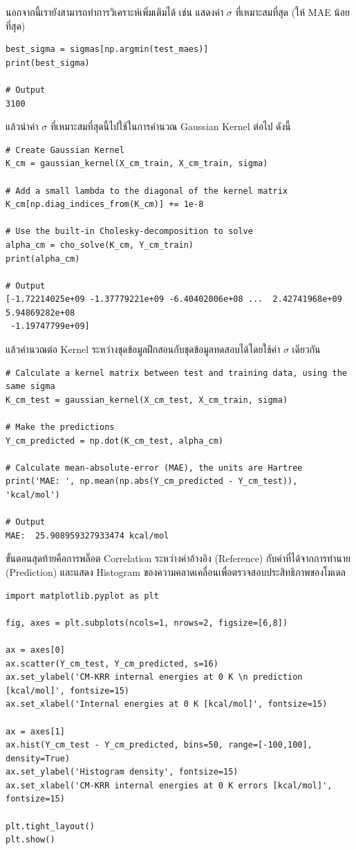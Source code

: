 นอกจากนี้เรายังสามารถทำการวิเคราะห์เพิ่มเติมได้ เช่น แสดงค่า $\sigma$ ที่เหมาะสมที่สุด (ให้ MAE น้อยที่สุด)

\begin{lstlisting}[style=MyPython]
best_sigma = sigmas[np.argmin(test_maes)]
print(best_sigma)

# Output
3100
\end{lstlisting}

\noindent แล้วนำค่า $\sigma$ ที่เหมาะสมที่สุดนี้ไปใช้ในการคำนวณ Gaussian Kernel ต่อไป ดังนี้

\begin{lstlisting}[style=MyPython]
# Create Gaussian Kernel
K_cm = gaussian_kernel(X_cm_train, X_cm_train, sigma)

# Add a small lambda to the diagonal of the kernel matrix
K_cm[np.diag_indices_from(K_cm)] += 1e-8

# Use the built-in Cholesky-decomposition to solve
alpha_cm = cho_solve(K_cm, Y_cm_train)
print(alpha_cm)

# Output
[-1.72214025e+09 -1.37779221e+09 -6.40402006e+08 ...  2.42741968e+09  5.94869282e+08
 -1.19747799e+09]
\end{lstlisting}

\noindent แล้วคำนวณต่อ Kernel ระหว่างชุดข้อมูลฝึกสอนกับชุดข้อมูลทดสอบได้โดยใช้ค่า $\sigma$ เดียวกัน

\begin{lstlisting}[style=MyPython]
# Calculate a kernel matrix between test and training data, using the same sigma
K_cm_test = gaussian_kernel(X_cm_test, X_cm_train, sigma)

# Make the predictions
Y_cm_predicted = np.dot(K_cm_test, alpha_cm)

# Calculate mean-absolute-error (MAE), the units are Hartree
print('MAE: ', np.mean(np.abs(Y_cm_predicted - Y_cm_test)), 'kcal/mol')

# Output
MAE:  25.908959327933474 kcal/mol
\end{lstlisting}

ขั้นตอนสุดท้ายคือการพล็อต Correlation ระหว่างค่าอ้างอิง (Reference) กับค่าที่ได้จากการทำนาย (Prediction) และแสดง Histogram 
ของความคลาดเคลื่อนเพื่อตรวจสอบประสิทธิภาพของโมเดล

\begin{lstlisting}[style=MyPython]
import matplotlib.pyplot as plt

fig, axes = plt.subplots(ncols=1, nrows=2, figsize=[6,8])

ax = axes[0]
ax.scatter(Y_cm_test, Y_cm_predicted, s=16)
ax.set_ylabel('CM-KRR internal energies at 0 K \n prediction [kcal/mol]', fontsize=15)
ax.set_xlabel('Internal energies at 0 K [kcal/mol]', fontsize=15)

ax = axes[1]
ax.hist(Y_cm_test - Y_cm_predicted, bins=50, range=[-100,100], density=True)
ax.set_ylabel('Histogram density', fontsize=15)
ax.set_xlabel('CM-KRR internal energies at 0 K errors [kcal/mol]', fontsize=15)

plt.tight_layout()
plt.show()
\end{lstlisting}

